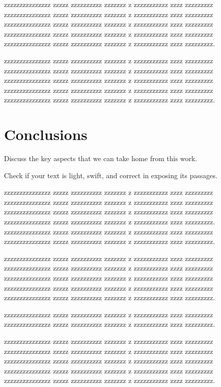 \documentclass[prl,twocolumn]{revtex4-1}
\begin{document}
  zzzzzzzzzzzzzzz zzzzz zzzzzzzzzz zzzzzzz z zzzzzzzzzzz zzzz zzzzzzzzz
  zzzzzzzzzzzzzzz zzzzz zzzzzzzzzz zzzzzzz z zzzzzzzzzzz zzzz zzzzzzzzz
  zzzzzzzzzzzzzzz zzzzz zzzzzzzzzz zzzzzzz z zzzzzzzzzzz zzzz zzzzzzzzz
  zzzzzzzzzzzzzzz zzzzz zzzzzzzzzz zzzzzzz z zzzzzzzzzzz zzzz zzzzzzzzz
  zzzzzzzzzzzzzzz zzzzz zzzzzzzzzz zzzzzzz z zzzzzzzzzzz zzzz zzzzzzzzz.

  


  zzzzzzzzzzzzzzz zzzzz zzzzzzzzzz zzzzzzz z zzzzzzzzzzz zzzz zzzzzzzzz
  zzzzzzzzzzzzzzz zzzzz zzzzzzzzzz zzzzzzz z zzzzzzzzzzz zzzz zzzzzzzzz
  zzzzzzzzzzzzzzz zzzzz zzzzzzzzzz zzzzzzz z zzzzzzzzzzz zzzz zzzzzzzzz
  zzzzzzzzzzzzzzz zzzzz zzzzzzzzzz zzzzzzz z zzzzzzzzzzz zzzz zzzzzzzzz
  zzzzzzzzzzzzzzz zzzzz zzzzzzzzzz zzzzzzz z zzzzzzzzzzz zzzz zzzzzzzzz.

\section{Conclusions}

Discuss the key aspects that we can take home from this work.

Check if your text is light, swift, and correct in exposing its passages.

  zzzzzzzzzzzzzzz zzzzz zzzzzzzzzz zzzzzzz z zzzzzzzzzzz zzzz zzzzzzzzz
  zzzzzzzzzzzzzzz zzzzz zzzzzzzzzz zzzzzzz z zzzzzzzzzzz zzzz zzzzzzzzz
  zzzzzzzzzzzzzzz zzzzz zzzzzzzzzz zzzzzzz z zzzzzzzzzzz zzzz zzzzzzzzz
  zzzzzzzzzzzzzzz zzzzz zzzzzzzzzz zzzzzzz z zzzzzzzzzzz zzzz zzzzzzzzz.
  zzzzzzzzzzzzzzz zzzzz zzzzzzzzzz zzzzzzz z zzzzzzzzzzz zzzz zzzzzzzzz
  zzzzzzzzzzzzzzz zzzzz zzzzzzzzzz zzzzzzz z zzzzzzzzzzz zzzz zzzzzzzzz.

  
  zzzzzzzzzzzzzzz zzzzz zzzzzzzzzz zzzzzzz z zzzzzzzzzzz zzzz zzzzzzzzz
  zzzzzzzzzzzzzzz zzzzz zzzzzzzzzz zzzzzzz z zzzzzzzzzzz zzzz zzzzzzzzz
  zzzzzzzzzzzzzzz zzzzz zzzzzzzzzz zzzzzzz z zzzzzzzzzzz zzzz zzzzzzzzz
  zzzzzzzzzzzzzzz zzzzz zzzzzzzzzz zzzzzzz z zzzzzzzzzzz zzzz zzzzzzzzz
  zzzzzzzzzzzzzzz zzzzz zzzzzzzzzz zzzzzzz z zzzzzzzzzzz zzzz zzzzzzzzz.
  
  zzzzzzzzzzzzzzz zzzzz zzzzzzzzzz zzzzzzz z zzzzzzzzzzz zzzz zzzzzzzzz
  zzzzzzzzzzzzzzz zzzzz zzzzzzzzzz zzzzzzz z zzzzzzzzzzz zzzz zzzzzzzzz.

  
  
  zzzzzzzzzzzzzzz zzzzz zzzzzzzzzz zzzzzzz z zzzzzzzzzzz zzzz zzzzzzzzz
  zzzzzzzzzzzzzzz zzzzz zzzzzzzzzz zzzzzzz z zzzzzzzzzzz zzzz zzzzzzzzz
  zzzzzzzzzzzzzzz zzzzz zzzzzzzzzz zzzzzzz z zzzzzzzzzzz zzzz zzzzzzzzz
  zzzzzzzzzzzzzzz zzzzz zzzzzzzzzz zzzzzzz z zzzzzzzzzzz zzzz zzzzzzzzz
  zzzzzzzzzzzzzzz zzzzz zzzzzzzzzz zzzzzzz z zzzzzzzzzzz zzzz zzzzzzzzz.
  
\end{document}
